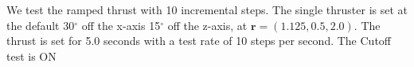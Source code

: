 We test the ramped thrust with 10 incremental steps. The single thruster is set at the default 30$^\circ$ off the x-axis 15$^\circ$ off the z-axis, at $\bm r = \left(1.125,0.5,2.0\right)$. The thrust is set for 5.0 seconds with a test rate of 10 steps per second. The Cutoff test is ON